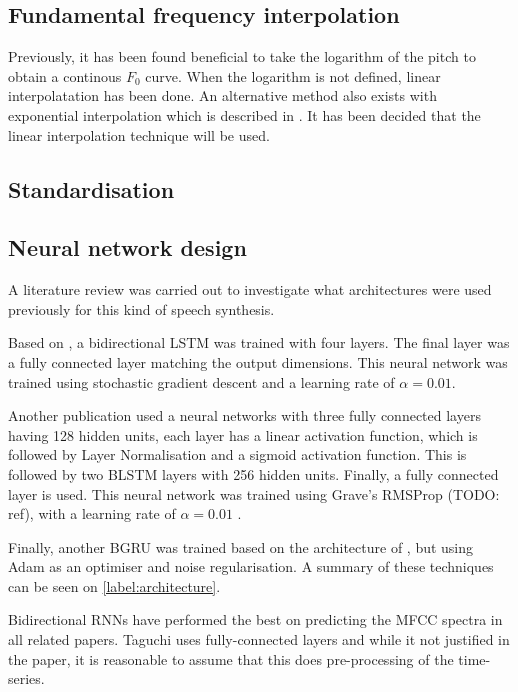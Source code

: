 \documentclass[a4paper]{article}
\begin{document}
\subsection{Fundamental frequency interpolation}

Previously, it has been found beneficial to take the logarithm of the
pitch to obtain a continous \( F_0 \) curve.
When the logarithm is not defined, linear  interpolatation has been done. \cite{Gonzalez2017}
An alternative method also exists with exponential interpolation
which is described in \cite{Chen1997}. It has been decided that the
linear interpolation technique will be used. 

\subsection{Standardisation}


\subsection{Neural network design}

A literature review was carried out to investigate what architectures were used previously
for this kind of speech synthesis.

Based on \cite{Liu2018}, a bidirectional LSTM was trained with four layers.
The final layer was a fully connected layer matching the output dimensions.
This neural network was trained using stochastic gradient descent and
a learning rate of \( \alpha = 0.01 \).

Another publication \cite{Taguchi} used a neural networks with three fully
connected layers having 128 hidden units, each layer has a linear activation
function, which is followed by Layer Normalisation and a sigmoid activation
function. This is followed by two BLSTM layers with 256 hidden units. Finally,
a fully connected layer is used. This neural network was trained using Grave's RMSProp (TODO: ref),
with a learning rate of \( \alpha = 0.01 \) .

Finally, another BGRU was trained based on the architecture of
\cite{Gonzalez2017}, but using Adam as an optimiser \cite{Kingma2015} and noise regularisation. A summary of these techniques can be seen on \ref{label:architecture}.

Bidirectional RNNs have performed the best on predicting the MFCC spectra in
all related papers. Taguchi uses fully-connected layers and while it not justified in the paper, it
is reasonable to assume that this does pre-processing of the time-series.
\end{document}
